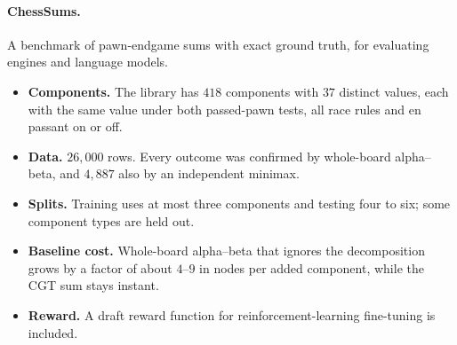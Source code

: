 \paragraph{ChessSums.} A benchmark of pawn-endgame sums with exact ground truth, for evaluating engines and
language models.
\begin{itemize}
\item \textbf{Components.} The library has $418$ components with $37$ distinct values, each with the same value
  under both passed-pawn tests, all race rules and en passant on or off.
\item \textbf{Data.} $26{,}000$ rows. Every outcome was confirmed by whole-board alpha--beta, and $4{,}887$ also by
  an independent minimax.
\item \textbf{Splits.} Training uses at most three components and testing four to six; some component types are
  held out.
\item \textbf{Baseline cost.} Whole-board alpha--beta that ignores the decomposition grows by a factor of about
  $4$--$9$ in nodes per added component, while the CGT sum stays instant.
\item \textbf{Reward.} A draft reward function for reinforcement-learning fine-tuning is included.
\end{itemize}
